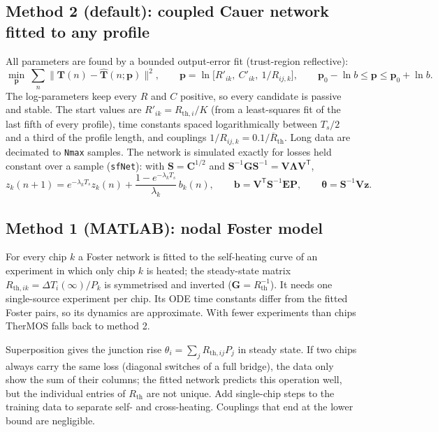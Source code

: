 \documentclass[11pt,a4paper]{article}
\newcommand{\Rth}{R_{\mathrm{th}}}
\newcommand{\T}{^{\mathsf T}}
\newcommand{\mat}[1]{\bm{#1}}
\newcommand{\cfg}[1]{\texttt{#1}}
\begin{document}
\subsection{Method 2 (default): coupled Cauer network fitted to any profile}
All parameters are found by a bounded output-error fit (trust-region reflective):
\begin{equation}
  \min_{\bm p}\ \sum_n \bigl\lVert \bm T(n) - \hat{\bm T}(n;\bm p)\bigr\rVert^2,\qquad
  \bm p = \ln\bigl[R'_{ik},\ C'_{ik},\ 1/R_{ij,k}\bigr],\qquad \bm p_0 - \ln b \le \bm p \le \bm p_0 + \ln b .
\end{equation}
The log-parameters keep every $R$ and $C$ positive, so every candidate is passive and stable. The start values are
$R'_{ik}=R_{\mathrm{th},i}/K$ (from a least-squares fit of the last fifth of every profile), time constants spaced
logarithmically between $T_s/2$ and a third of the profile length, and couplings $1/R_{ij,k}=0.1/\overline{R}_{\mathrm{th}}$.
Long data are decimated to \cfg{Nmax} samples. The network is simulated exactly for losses held constant over a
sample (\texttt{sfNet}): with $\mat S=\mat C^{1/2}$ and $\mat S^{-1}\mat G\mat S^{-1}=\mat V\bm\Lambda\mat V\T$,
\begin{equation}
  z_k(n+1) = e^{-\lambda_kT_s}z_k(n) + \frac{1-e^{-\lambda_kT_s}}{\lambda_k}\,b_k(n),\qquad
  \bm b = \mat V\T\mat S^{-1}\mat E\bm P,\qquad \bm\theta = \mat S^{-1}\mat V\bm z .
\end{equation}

\subsection{Method 1 (MATLAB): nodal Foster model}
For every chip $k$ a Foster network is fitted to the self-heating curve of an experiment in which only chip $k$ is
heated; the steady-state matrix $R_{\mathrm{th},ik}=\Delta T_i(\infty)/P_k$ is symmetrised and inverted
($\mat G=\Rth^{-1}$). It needs one single-source experiment per chip. Its ODE time constants differ from the fitted
Foster pairs, so its dynamics are approximate. With fewer experiments than chips TherMOS falls back to method 2.

\begin{keybox}[Identifiability]
Superposition gives the junction rise $\theta_i = \sum_j R_{\mathrm{th},ij}P_j$ in steady state. If two chips always
carry the same loss (diagonal switches of a full bridge), the data only show the sum of their columns; the fitted
network predicts this operation well, but the individual entries of $\Rth$ are not unique. Add single-chip steps
to the training data to separate self- and cross-heating. Couplings that end at the lower bound are negligible.
\end{keybox}
\end{document}

